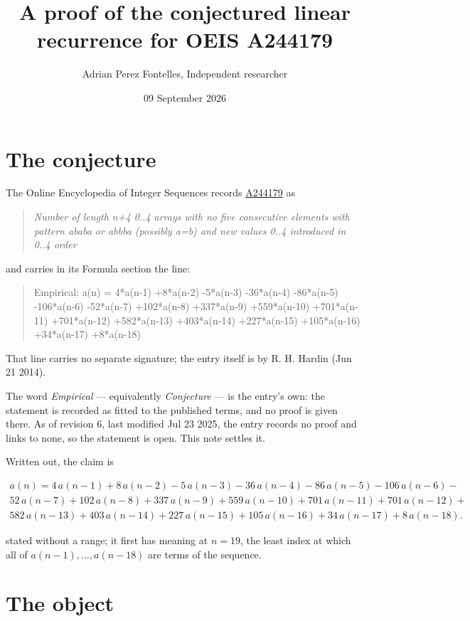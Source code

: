 \documentclass[11pt]{article}
\title{A proof of the conjectured linear recurrence for OEIS A244179}
\author{Adrian Perez Fontelles, Independent researcher}
\date{09 September 2026}
\theoremstyle{definition}
\begin{document}
\maketitle
\section{The conjecture}

The Online Encyclopedia of Integer Sequences records \href{https://oeis.org/A244179}{A244179} as

\begin{quote}\itshape Number of length n+4 0..4 arrays with no five consecutive elements with pattern ababa or abbba (possibly a=b) and new values 0..4 introduced in 0..4 order\end{quote}

and carries in its Formula section the line:

\begin{quote}\ttfamily Empirical: a(n) = 4*a(n-1) +8*a(n-2) -5*a(n-3) -36*a(n-4) -86*a(n-5) -106*a(n-6) -52*a(n-7) +102*a(n-8) +337*a(n-9) +559*a(n-10) +701*a(n-11) +701*a(n-12) +582*a(n-13) +403*a(n-14) +227*a(n-15) +105*a(n-16) +34*a(n-17) +8*a(n-18)\end{quote}

That line carries no separate signature; the entry itself is by R. H. Hardin (Jun 21 2014).

The word {\itshape Empirical} --- equivalently {\itshape Conjecture} --- is the entry's own: the statement is recorded as fitted to the published terms, and no proof is given there. As of revision 6, last modified Jul 23 2025, the entry records no proof and links to none, so the statement is open. This note settles it.

Written out, the claim is

\begin{multline*} a(n) = 4\,a(n-1) + 8\,a(n-2) - 5\,a(n-3) - 36\,a(n-4) - 86\,a(n-5) - 106\,a(n-6) - \\ 52\,a(n-7) + 102\,a(n-8) + 337\,a(n-9) + 559\,a(n-10) + 701\,a(n-11) + 701\,a(n-12) + \\ 582\,a(n-13) + 403\,a(n-14) + 227\,a(n-15) + 105\,a(n-16) + 34\,a(n-17) + 8\,a(n-18). \end{multline*}

stated without a range; it first has meaning at $n = 19$, the least index at which all of $a(n-1),\dots,a(n-18)$ are terms of the sequence.

\section{The object}
\end{document}
